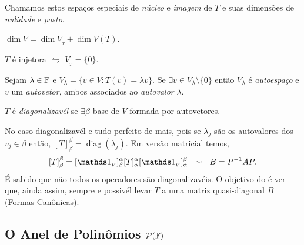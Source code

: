 \begin{note}
    Chamamos estos espaços especiais de \emph{núcleo} e \emph{imagem} de \(T\) e suas dimensões de \emph{nulidade} e \emph{posto}. 
\end{note}

\begin{theorem}
    \(\dim V = \dim V_{_T} + \dim V(T)\). 
\end{theorem}

\begin{proposition}
    \(T \) é injetora \(\leftrightharpoons\) \(V_{_T} = \{0\}\). 
\end{proposition}

\begin{definition}
    Sejam \(\lambda \in \mathbb{F}\) e \(V_\lambda = \{v\in V: T(v) = \lambda v \}\). Se \(\exists v\in V_\lambda \setminus\{0\}\) então \(V_\lambda\) é \emph{autoespaço} e \(v\) um \emph{autovetor}, ambos associados ao \emph{autovalor} \(\lambda\). 
\end{definition}


\begin{definition}
    \(T\) é \emph{diagonalizavél} se \(\exists \beta \) base de \(V\) formada por autovetores.
\end{definition}

\begin{note}
    No caso diagonalizavél e tudo perfeito de mais, pois se \(\lambda_j\) são os autovalores dos \(v_j \in \beta \) então, \([T]^\beta_\beta = \operatorname{diag}(\lambda_j)\). Em versão matricial temos,
    \[[T]^\beta_\beta = [\id_{_V}]^\alpha_\beta [T]^\alpha_\alpha [\id_{_V}]^\beta_\alpha \ \ \sim \ \ B = P^{-1} A P.\]
    É sabido que não todos os operadores são diagonalizavéis. O objetivo do \cite[Cap. 8]{MA719} é ver que, ainda assim, sempre e possivél levar \(T\) a uma matriz quasi-diagonal $B$ (Formas Canônicas). 
\end{note}

\subsection*{O Anel de Polinômios \(\mathcal{P}(\mathbb{F})\)}

